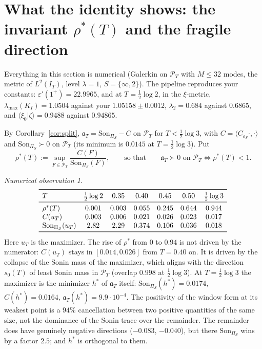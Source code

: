 \documentclass[11pt]{amsart}
\theoremstyle{definition}
\theoremstyle{remark}
\newtheorem{observation}[theorem]{Numerical observation}
\newcommand{\IT}{I_T}
\newcommand{\PT}{\mathcal P_T}
\newcommand{\Son}{\mathrm{Son}}
\begin{document}
\section{What the identity shows: the invariant $\rho^*(T)$ and the fragile direction}\label{sec:num}

Everything in this section is numerical (Galerkin on $\PT$ with $M\le32$ modes, the metric of $L^2(\IT)$, level $\lambda=1$,
$S=\{\infty,2\}$). The pipeline reproduces your constants: $\varepsilon'(1^+)=22.9965$, and at $T=\frac12\log2$, in the
$\xi$-metric, $\lambda_{\max}(K_I)=1.0504$ against your $1.05158\pm0.0012$, $\lambda_2=0.684$ against $0.6865$, and
$\langle\xi_0|\zeta\rangle=0.9488$ against $0.94865$.

By Corollary~\ref{cor:split}, $\mathfrak a_T=\Son_{\Pi_S}-C$ on $\PT$ for $T<\frac12\log3$, with $C=\langle C_{\varepsilon_S}\cdot,\cdot\rangle$
and $\Son_{\Pi_S}\succ0$ on $\PT$ (its minimum is $0.0145$ at $T=\frac12\log3$). Put
\[
\rho^*(T):=\sup_{F\in\PT}\frac{C(F)}{\Son_{\Pi_S}(F)},\qquad\text{so that}\qquad \mathfrak a_T\succ0\text{ on }\PT\iff\rho^*(T)<1 .
\]

\begin{observation}\label{obs:rho}
\[
\begin{array}{lcccccc}\toprule
T & \tfrac12\log2 & 0.35 & 0.40 & 0.45 & 0.50 & \tfrac12\log3\\ \midrule
\rho^*(T) & 0.001 & 0.003 & 0.055 & 0.245 & 0.644 & 0.944\\
C(u_T) & 0.003 & 0.006 & 0.021 & 0.026 & 0.023 & 0.017\\
\Son_{\Pi_S}(u_T) & 2.82 & 2.29 & 0.374 & 0.106 & 0.036 & 0.018\\ \bottomrule
\end{array}
\]
Here $u_T$ is the maximizer. The rise of $\rho^*$ from $0$ to $0.94$ is not driven by the numerator: $C(u_T)$ stays in
$[0.014,0.026]$ from $T=0.40$ on. It is driven by the collapse of the Sonin mass of the maximizer, which aligns with the
direction $s_0(T)$ of least Sonin mass in $\PT$ (overlap $0.998$ at $\frac12\log3$). At $T=\frac12\log3$ the maximizer is the
minimizer $h^*$ of $\mathfrak a_T$ itself: $\Son_{\Pi_S}(h^*)=0.0174$, $C(h^*)=0.0164$, $\mathfrak a_T(h^*)=9.9\cdot10^{-4}$. The
positivity of the window form at its weakest point is a $94\%$ cancellation between two positive quantities of the same size,
not the dominance of the Sonin trace over the remainder. The remainder does have genuinely negative directions
($-0.083$, $-0.040$), but there $\Son_{\Pi_S}$ wins by a factor $2.5$; and $h^*$ is orthogonal to them.
\end{observation}
\end{document}
